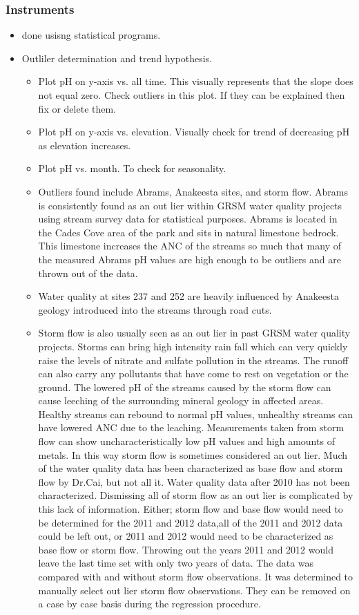     \subsubsection{Instruments}
    \begin{itemize}
    	\item done usisng statistical programs.
        \item Outliler determination and trend hypothesis.
        \begin{itemize}
        	\item Plot pH on y-axis vs. all time.  This visually represents that the slope does not equal zero.  Check outliers in this plot.  If they can be explained then fix or delete them. 
        	\item Plot pH on y-axis vs. elevation.  Visually check for trend of decreasing pH as elevation increases.
        	\item Plot pH vs. month.  To check for seasonality.
        	\item Outliers found include Abrams, Anakeesta sites, and storm flow.  Abrams is consistently found as an out lier within GRSM water quality projects using stream survey data for statistical purposes.  Abrams is located in the Cades Cove area of the park and sits in natural limestone bedrock.  This limestone increases the ANC of the streams so much that many of  the measured Abrams pH values are high enough to be outliers and are thrown out of the data.
        	\item Water quality at sites 237 and 252 are heavily influenced by Anakeesta geology introduced into the streams through road cuts.
        	\item Storm flow is also usually seen as an out lier in past GRSM water quality projects.  Storms can bring high intensity rain fall which can very quickly raise the levels of nitrate and sulfate pollution in the streams.  The runoff can also carry any pollutants that have come to rest on vegetation or the ground.  The lowered pH of the streams caused by the storm flow can cause leeching of the surrounding mineral geology in affected areas. Healthy streams can rebound to normal pH values, unhealthy streams can have lowered ANC due to the leaching.  Measurements taken from storm flow can show uncharacteristically low pH values and high amounts of metals.  In this way storm flow is sometimes considered an out lier.  Much of the water quality data has been characterized as base flow and storm flow by Dr.Cai, but not all it.  Water quality data after 2010 has not been characterized.  Dismissing all of  storm flow as an out lier is complicated by this lack of information.  Either; storm flow and base flow would need to be determined for the 2011 and 2012 data,all of the 2011 and 2012 data could be left out, or 2011 and 2012 would need to be characterized as base flow or storm flow.  Throwing out the years 2011 and 2012 would leave the last time set with only two years of data.  The data was compared with and without storm flow observations.  It was determined to manually select out lier storm flow observations.  They can be removed on a case by case basis during the regression procedure.

\end{itemize}
\end{itemize}
